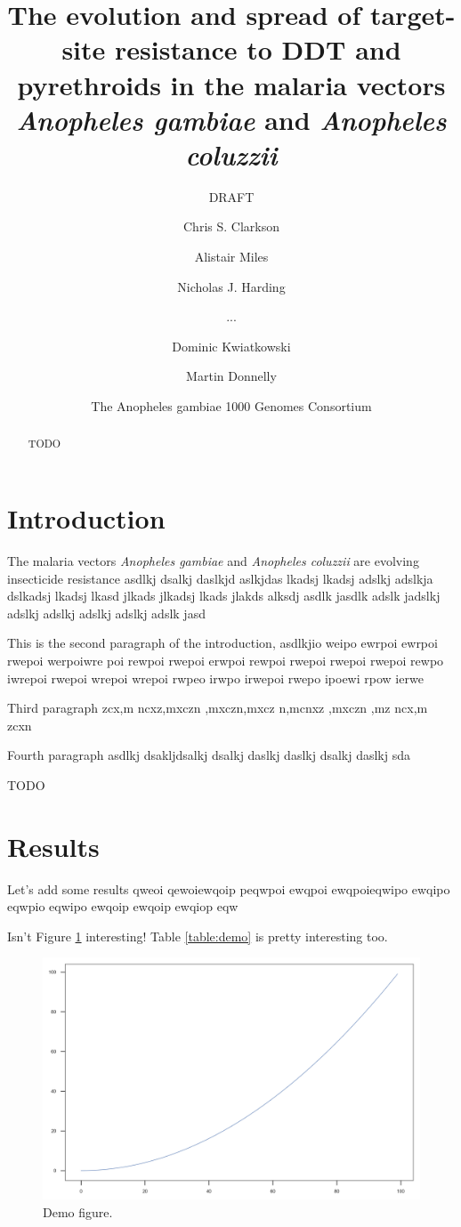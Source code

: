 \documentclass[a4paper,10pt,abstracton]{scrartcl}
\title{The evolution and spread of target-site resistance to DDT and pyrethroids in the malaria vectors \emph{Anopheles gambiae} and \emph{Anopheles coluzzii}}
\subtitle{DRAFT}
\author{
	Chris S. Clarkson
	\and 
	Alistair Miles
	\and
	Nicholas J. Harding
        \and
        ...
	\and
	Dominic Kwiatkowski
	\and
	Martin Donnelly
	\and
	The Anopheles gambiae 1000 Genomes Consortium
}
\begin{document}
\maketitle

\begin{abstract}

TODO

\end{abstract}

\section*{Introduction}

The malaria vectors \emph{Anopheles gambiae} and \emph{Anopheles
  coluzzii} are evolving insecticide resistance asdlkj dsalkj daslkjd
aslkjdas lkadsj lkadsj adslkj adslkja dslkadsj lkadsj lkasd jlkads
jlkadsj lkads jlakds alksdj asdlk jasdlk adslk jadslkj adslkj adslkj
adslkj adslkj adslk jasd

This is the second paragraph of the introduction, asdlkjio weipo
ewrpoi ewrpoi rwepoi werpoiwre poi rewpoi rwepoi erwpoi rewpoi rwepoi
rwepoi rwepoi rewpo iwrepoi rwepoi wrepoi wrepoi rwpeo irwpo irwepoi
rwepo ipoewi rpow ierwe

Third paragraph zcx,m ncxz,mxczn ,mxczn,mxcz n,mcnxz ,mxczn ,mz ncx,m
zcxn

Fourth paragraph asdlkj dsakljdsalkj dsalkj daslkj daslkj dsalkj
daslkj sda

TODO

\section*{Results}

Let's add some results qweoi qewoiewqoip peqwpoi ewqpoi ewqpoieqwipo
ewqipo eqwpio eqwipo ewqoip ewqoip ewqiop eqw

Isn't Figure \ref{fig:demo} interesting! Table \ref{table:demo} is
pretty interesting too.

\begin{figure}[t!]
  \includegraphics[width=1.1\linewidth,center]{artwork/demo.png}
  \caption{Demo figure.}
  \label{fig:demo}
\end{figure}
\end{document}
